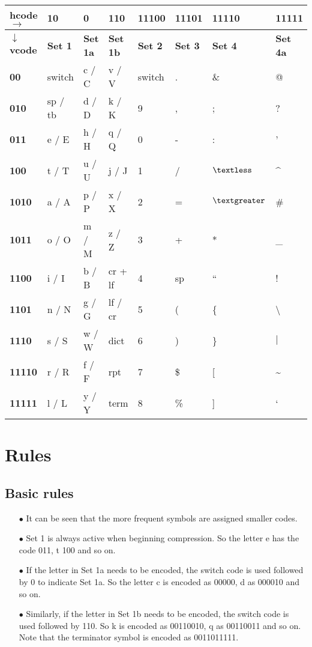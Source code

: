 \documentclass[]{article}
\begin{document}
\begin{center}
	\begin{tabular}{ | l | l | l | l | l | l | l | l | } \hline
		\textbf{hcode $\rightarrow$} & \textbf{10} & \textbf{0} & \textbf{110} & \textbf{11100} & \textbf{11101} & \textbf{11110} & \textbf{11111} \\ \hline
		\textbf{$\downarrow$ vcode} & \textbf{Set 1} & \textbf{Set 1a} & \textbf{Set 1b} & \textbf{Set 2} & \textbf{Set 3} & \textbf{Set 4} & \textbf{Set 4a} \\ \hline
		\textbf{00} & switch & c / C & v / V & switch & . & \& & @ \\ \hline
		\textbf{010} & sp / tb & d / D & k / K & 9 & , & ; & ? \\ \hline
		\textbf{011} & e / E & h / H & q / Q & 0 & - & : & ' \\ \hline
		\textbf{100} & t / T & u / U & j / J & 1 & / & $\textless$ & \^{} \\ \hline
		\textbf{1010} & a / A & p / P & x / X & 2 & = & $\textgreater$ & \# \\ \hline
		\textbf{1011} & o / O & m / M & z / Z & 3 & + & * & \_ \\ \hline
		\textbf{1100} & i / I & b / B & cr + lf & 4 & sp & \textquotedblleft & ! \\ \hline
		\textbf{1101} & n / N & g / G & lf / cr & 5 & ( & \{ & \textbackslash \\ \hline
		\textbf{1110} & s / S & w / W & dict & 6 & ) & \} & $|$ \\ \hline
		\textbf{11110} & r / R & f / F & rpt & 7 & \$ & [ & \~{} \\ \hline
		\textbf{11111} & l / L & y / Y & term & 8 & \% & ] & ` \\ \hline
	\end{tabular}
\end{center}

\section{Rules}

\subsection{Basic rules}
\begin{itemize}
	\item[$\bullet$] It can be seen that the more frequent symbols are assigned smaller codes.
	\item[$\bullet$] Set 1 is always active when beginning compression.  So the letter e has the code 011, t 100 and so on.
	\item[$\bullet$] If the letter in Set 1a needs to be encoded, the switch code is used followed by 0 to indicate Set 1a.  So the letter c is encoded as 00000, d as 000010 and so on.
	\item[$\bullet$] Similarly, if the letter in Set 1b needs to be encoded, the switch code is used followed by 110. So k is encoded as 00110010, q as 00110011 and so on. Note that the terminator symbol is encoded as 0011011111.
\end{itemize}
\end{document}
